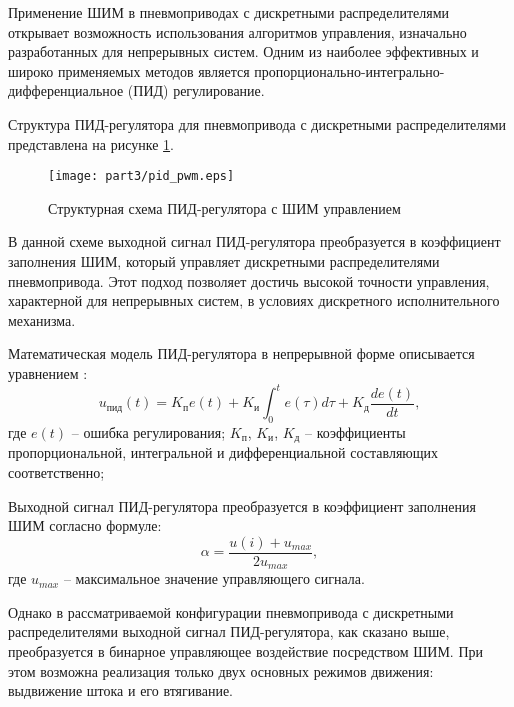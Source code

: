 Применение ШИМ в пневмоприводах с дискретными распределителями открывает
возможность использования алгоритмов управления,
изначально разработанных для непрерывных систем.
Одним из наиболее эффективных и широко применяемых методов является
пропорционально-интегрально-дифференциальное (ПИД) регулирование.

Структура ПИД-регулятора для пневмопривода
с дискретными распределителями представлена на рисунке \ref{fig:ch3:pid_pwm_control}.

\begin{figure}[ht]
	\centering
	\texttt{[image: part3/pid\_pwm.eps]}
	\caption{Структурная схема ПИД-регулятора с ШИМ управлением}
	\label{fig:ch3:pid_pwm_control}
\end{figure}

В данной схеме выходной сигнал ПИД-регулятора преобразуется в коэффициент
заполнения ШИМ, который управляет дискретными распределителями
пневмопривода. Этот подход позволяет достичь высокой точности
управления, характерной для непрерывных систем, в условиях
дискретного исполнительного механизма.

Математическая модель ПИД-регулятора в непрерывной форме описывается уравнением \cite{pid_pwm}:
\begin{equation}\label{eq:pid_base}
	u_{\text{пид}}(t) = K_{\text{п}} e(t) + K_{\text{и}} \int_0^t e(\tau)d\tau + K_{\text{д}}\frac{de(t)}{dt},
\end{equation}
где
$e(t)$ -- ошибка регулирования;
$K_\text{п}$, $K_\text{и}$, $K_\text{д}$ -- коэффициенты пропорциональной, интегральной и
дифференциальной составляющих соответственно;

Выходной сигнал ПИД-регулятора преобразуется в коэффициент заполнения ШИМ согласно формуле:
\begin{equation}
	\alpha = \frac{u(i) + u_{max}}{2u_{max}},
\end{equation}
где $u_{max}$ -- максимальное значение управляющего сигнала.

Однако в рассматриваемой конфигурации пневмопривода с дискретными распределителями
выходной сигнал ПИД-регулятора, как сказано выше, преобразуется в бинарное
управляющее воздействие посредством ШИМ. При этом возможна реализация
только двух основных режимов движения: выдвижение штока и его втягивание.


